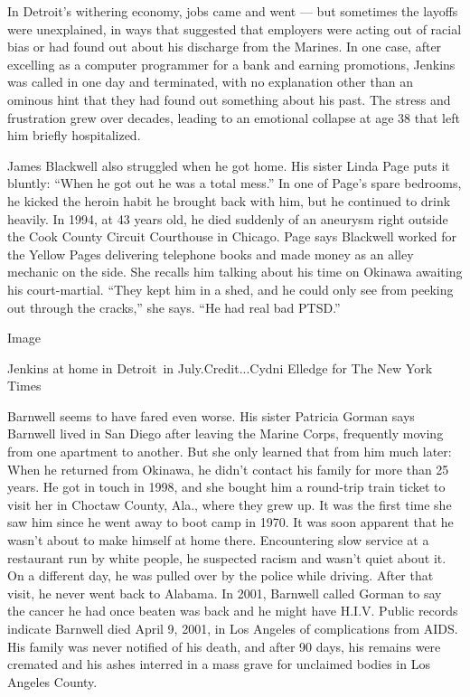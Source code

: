 In Detroit's withering economy, jobs came and went --- but sometimes the
layoffs were unexplained, in ways that suggested that employers were
acting out of racial bias or had found out about his discharge from the
Marines. In one case, after excelling as a computer programmer for a
bank and earning promotions, Jenkins was called in one day and
terminated, with no explanation other than an ominous hint that they had
found out something about his past. The stress and frustration grew over
decades, leading to an emotional collapse at age 38 that left him
briefly hospitalized.

James Blackwell also struggled when he got home. His sister Linda Page
puts it bluntly: ``When he got out he was a total mess.'' In one of
Page's spare bedrooms, he kicked the heroin habit he brought back with
him, but he continued to drink heavily. In 1994, at 43 years old, he
died suddenly of an aneurysm right outside the Cook County Circuit
Courthouse in Chicago. Page says Blackwell worked for the Yellow Pages
delivering telephone books and made money as an alley mechanic on the
side. She recalls him talking about his time on Okinawa awaiting his
court-martial. ``They kept him in a shed, and he could only see from
peeking out through the cracks,'' she says. ``He had real bad PTSD.''

Image

Jenkins at home in Detroit~in July.Credit...Cydni Elledge for The New
York Times

Barnwell seems to have fared even worse. His sister Patricia Gorman says
Barnwell lived in San Diego after leaving the Marine Corps, frequently
moving from one apartment to another. But she only learned that from him
much later: When he returned from Okinawa, he didn't contact his family
for more than 25 years. He got in touch in 1998, and she bought him a
round-trip train ticket to visit her in Choctaw County, Ala., where they
grew up. It was the first time she saw him since he went away to boot
camp in 1970. It was soon apparent that he wasn't about to make himself
at home there. Encountering slow service at a restaurant run by white
people, he suspected racism and wasn't quiet about it. On a different
day, he was pulled over by the police while driving. After that visit,
he never went back to Alabama. In 2001, Barnwell called Gorman to say
the cancer he had once beaten was back and he might have H.I.V. Public
records indicate Barnwell died April 9, 2001, in Los Angeles of
complications from AIDS. His family was never notified of his death, and
after 90 days, his remains were cremated and his ashes interred in a
mass grave for unclaimed bodies in Los Angeles County.

